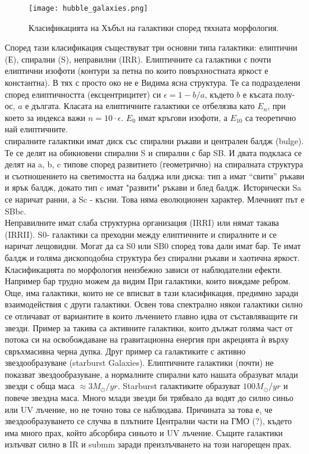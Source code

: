 \documentclass[a4paper,12pt]{article}
\begin{document}
\begin{figure}[h!]
\centering
\texttt{[image: hubble\_galaxies.png]}
\caption{Класификацията на Хъбъл на галактики според тяхната морфология.}
\label{fig:hubble_galaxies}
\end{figure}

Според тази класификация съществуват три основни типа галактики: елиптични (Е), спирални (S), неправилни (IRR). Елиптичните са галактики с почти елиптични изофоти (контури за петна по които повърхностната яркост е константна). В тях с просто око не е Видима ясна структура. Те са подразделени според елиптичността (ексцентрицитет) си $\epsilon = 1- b/a$, където $b$ е късата полу-ос, $a$ е дългата.  Класата на елиптичните галактики се отбелязва като $E_n$,  при което за индекса важи $n=10 \cdot \epsilon$. $E_0$ имат кръгови изофоти, а $E_{10}$ са теоретично най елиптичните.\\

спиралните галактики имат диск със спирални ръкави и централен балдж (bulge). Те се делят на обикновени спирални S и спирални с бар SB. И двата подкласа се делят на a, b, c типове според развитието (геометрично) на спиралната структура и съотношението на светимостта на балджа или диска: тип а имат ``свити'' ръкави и ярък балдж, докато тип c  имат "развити" ръкави и блед балдж. Исторически Sa се наричат ранни,  а Sc - късни. Това няма еволюционен характер. Млечният път е SBbc.\\

Неправилните имат слаба структурна организация (IRRI) или нямат такава (IRRII). S0- галактики са преходни между елиптичните и спиралните и се наричат лещовидни. Могат да са S0 или SB0 според това дали имат бар. Те имат балдж и голяма дископодобна структура без спирални ръкави и хаотична яркост. Класификацията по морфология неизбежно зависи от наблюдателни ефекти. Например бар трудно можем да видим При галактики, които виждаме ребром. Още, има галактики, които не се вписват в тази класификация, предимно заради взаимодействия с други галактики. Освен това спектрално някои галактики силно се отличават от вариантите в които лъчението главно идва от съставляващите ги звезди. Пример за такива са активните галактики, които дължат голяма част от потока си на освобождаване на гравитационна енергия при акрецията ѝ върху свръхмасивна черна дупка. Друг пример са галактиките с активно звездообразуване (starburst Galaxies). Елиптичните галактики (почти) не показват звездообразуване, а нормалните спирални като нашата образуват млади звезди с обща маса $\approx 3 M_\odot /yr$. Starburst галактиките образуват $100 M_\odot /yr$ и повече звездна маса. Много млади звезди би трябвало да водят до силно синьо или UV лъчение, но не точно това се наблюдава. Причината за това е, че звездообразуването се случва в плътните Централни части на ГМО (?), където има много прах, който абсорбира синьото и UV лъчение. Същите галактики излъчват силно в IR и submm заради преизлъчването на този нагорещен прах.
\end{document}

